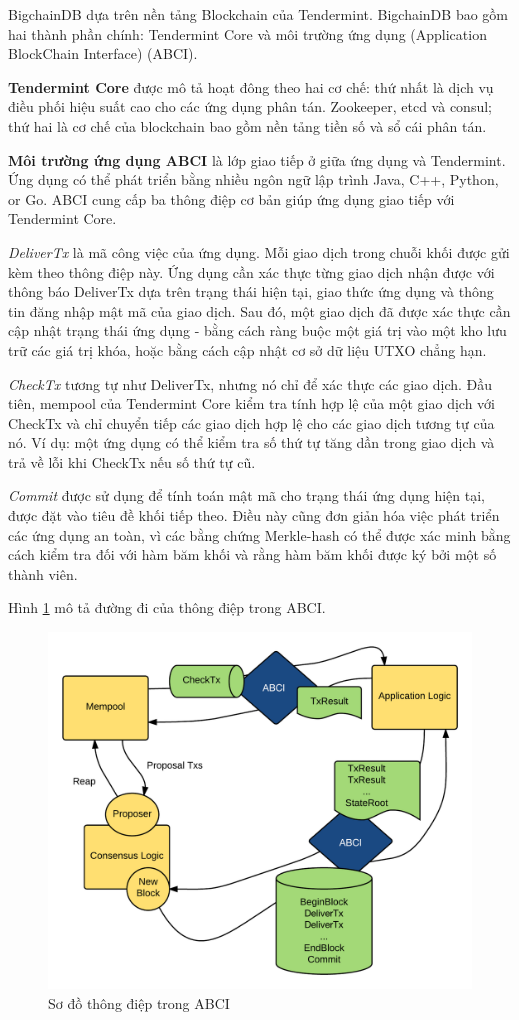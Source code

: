 BigchainDB dựa trên nền tảng Blockchain của Tendermint.
BigchainDB bao gồm hai thành phần chính: Tendermint Core và môi trường ứng dụng (Application BlockChain Interface) (ABCI).

\textbf{Tendermint Core} được mô tả hoạt đông theo hai cơ chế: thứ nhất là dịch vụ điều phối hiệu suất cao cho các ứng dụng phân tán. Zookeeper, etcd và consul; thứ hai là cơ chế của blockchain bao gồm nền tảng tiền số và sổ cái phân tán.

\textbf{Môi trường ứng dụng ABCI} là lớp giao tiếp ở giữa ứng dụng và Tendermint.
Ứng dụng có thể phát triển bằng nhiều ngôn ngữ lập trình Java, C++, Python, or Go. ABCI cung cấp ba thông điệp cơ bản giúp ứng dụng giao tiếp với Tendermint Core.

\emph{DeliverTx} là mã công việc của ứng dụng. Mỗi giao dịch trong chuỗi khối được gửi kèm theo thông điệp này. 
Ứng dụng cần xác thực từng giao dịch nhận được với thông báo DeliverTx dựa trên trạng thái hiện tại, giao thức ứng dụng và thông tin đăng nhập mật mã của giao dịch. 
Sau đó, một giao dịch đã được xác thực cần cập nhật trạng thái ứng dụng - bằng cách ràng buộc một giá trị vào một kho lưu trữ các giá trị khóa, hoặc bằng cách cập nhật cơ sở dữ liệu UTXO chẳng hạn.

\emph{CheckTx} tương tự như DeliverTx, nhưng nó chỉ để xác thực các giao dịch. 
Đầu tiên, mempool của Tendermint Core kiểm tra tính hợp lệ của một giao dịch với CheckTx và chỉ chuyển tiếp các giao dịch hợp lệ cho các giao dịch tương tự của nó. 
Ví dụ: một ứng dụng có thể kiểm tra số thứ tự tăng dần trong giao dịch và trả về lỗi khi CheckTx nếu số thứ tự cũ.

\emph{Commit} được sử dụng để tính toán mật mã cho trạng thái ứng dụng hiện tại, được đặt vào tiêu đề khối tiếp theo. 
Điều này cũng đơn giản hóa việc phát triển các ứng dụng an toàn, vì các bằng chứng Merkle-hash có thể được xác minh bằng cách kiểm tra đối với hàm băm khối và rằng hàm băm khối được ký bởi một số thành viên.

Hình \ref{fig:bc_abci} mô tả đường đi của thông điệp trong ABCI.

\begin{figure}[H]
\centering
\includegraphics[width=.9\linewidth]{img/bigchaindb.png}
\caption{Sơ đồ thông điệp trong ABCI}
\label{fig:bc_abci}
\end{figure}

